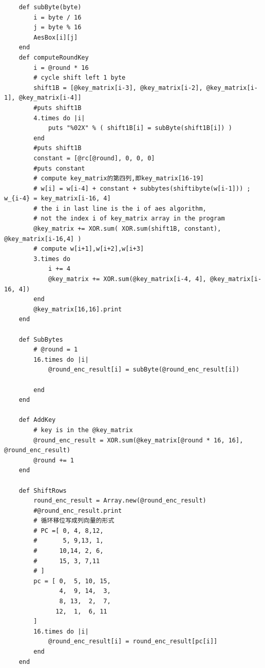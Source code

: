 \documentclass[10pt,a4paper]{article}
\begin{document}
\begin{verbatim}
    def subByte(byte)
        i = byte / 16
        j = byte % 16
        AesBox[i][j]
    end
    def computeRoundKey
        i = @round * 16
        # cycle shift left 1 byte
        shift1B = [@key_matrix[i-3], @key_matrix[i-2], @key_matrix[i-1], @key_matrix[i-4]]
        #puts shift1B
        4.times do |i|
            puts "%02X" % ( shift1B[i] = subByte(shift1B[i]) )
        end
        #puts shift1B
        constant = [@rc[@round], 0, 0, 0]
        #puts constant
        # compute key_matrix的第四列,即key_matrix[16-19] 
        # w[i] = w[i-4] + constant + subbytes(shiftibyte(w[i-1])) ; w_{i-4} = key_matrix[i-16, 4]
        # the i in last line is the i of aes algorithm, 
        # not the index i of key_matrix array in the program 
        @key_matrix += XOR.sum( XOR.sum(shift1B, constant), @key_matrix[i-16,4] )
        # compute w[i+1],w[i+2],w[i+3]
        3.times do
            i += 4
            @key_matrix += XOR.sum(@key_matrix[i-4, 4], @key_matrix[i-16, 4])
        end
        @key_matrix[16,16].print
    end

    def SubBytes
        # @round = 1
        16.times do |i|
            @round_enc_result[i] = subByte(@round_enc_result[i])

        end
    end

    def AddKey
        # key is in the @key_matrix
        @round_enc_result = XOR.sum(@key_matrix[@round * 16, 16], @round_enc_result)
        @round += 1
    end

    def ShiftRows
        round_enc_result = Array.new(@round_enc_result)
        #@round_enc_result.print
        # 循环移位写成列向量的形式
        # PC =[ 0, 4, 8,12,
        #       5, 9,13, 1,
        #      10,14, 2, 6,
        #      15, 3, 7,11
        # ]
        pc = [ 0,  5, 10, 15,
               4,  9, 14,  3,
               8, 13,  2,  7,
              12,  1,  6, 11
        ]
        16.times do |i|
            @round_enc_result[i] = round_enc_result[pc[i]]
        end
    end


\end{verbatim}
\end{document}
